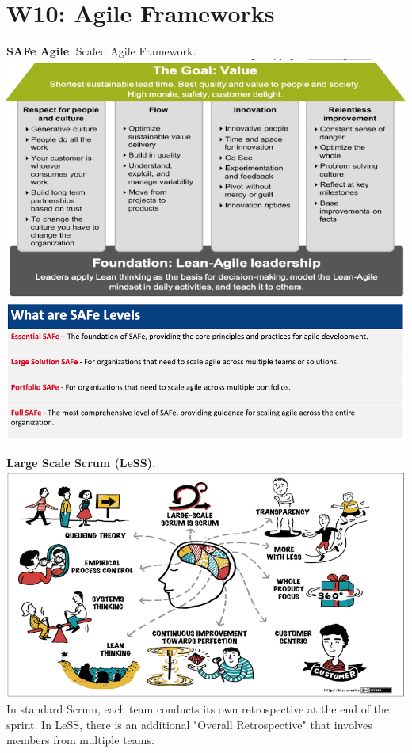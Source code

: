 \section{W10: Agile Frameworks}

\textbf{SAFe Agile}: Scaled Agile Framework.
\includegraphics[width=\linewidth]{figs/SCR-20240606-podj.png}
\includegraphics[width=\linewidth]{figs/SCR-20240606-prfh.png}

\textbf{Large Scale Scrum (LeSS).}
\includegraphics[width=\linewidth]{figs/SCR-20240606-prmd.png}
In standard Scrum, each team conducts its own retrospective at the end of the sprint. In LeSS, there is an additional "Overall Retrospective" that involves members from multiple teams.

